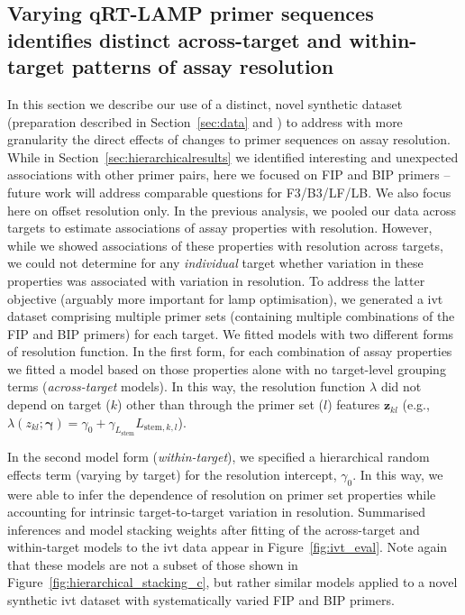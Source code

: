 \documentclass[../thesis.tex]{subfiles}
\begin{document}
\subsection{Varying qRT-LAMP primer sequences identifies distinct across-target and within-target patterns of assay resolution \label{sec:ivt_results}}
In this section we describe our use of a distinct, novel synthetic dataset (preparation described in Section~\ref{sec:data} and \citealp{remmel_diagnostic_2022}) to address with more granularity the direct effects of changes to primer sequences on assay resolution. While in Section~\ref{sec:hierarchicalresults} we identified interesting and unexpected associations with other primer pairs, here we focused on FIP and BIP primers -- future work will address comparable questions for F3/B3/LF/LB. We also focus here on offset resolution only. In the previous analysis, we pooled our data across targets to estimate associations of assay properties with resolution. However, while we showed associations of these properties with resolution across targets, we could not determine for any \emph{individual} target whether variation in these properties was associated with variation in resolution. To address the latter objective (arguably more important for \gls{lamp} optimisation), we generated a \gls{ivt}  dataset comprising multiple primer sets (containing multiple combinations of the FIP and BIP primers) for each target. We fitted models with two different forms of resolution function. In the first form, for each combination of assay properties we fitted a model based on those properties alone with no target-level grouping terms (\emph{across-target} models). In this way, the resolution function $\lambda$ did not depend on target ($k$) other than through the primer set ($l$) features $\bm{z}_{kl}$ (e.g., $\lambda(z_{kl}; \bm{\gamma}) = \gamma_0 + \gamma_{L_{\text{stem}}} L_{\text{stem},k,l}$).
 
In the second model form (\emph{within-target}), we specified a hierarchical random effects term (varying by target) for the resolution intercept, $\gamma_0$. In this way, we were able to infer the dependence of resolution on primer set properties while accounting for intrinsic target-to-target variation in resolution. Summarised inferences and model stacking weights after fitting of the across-target and within-target models to the \gls{ivt}  data appear in Figure~\ref{fig:ivt_eval}. Note again that these models are not a subset of those shown in Figure~\ref{fig:hierarchical_stacking_c}, but rather similar models applied to a novel synthetic \gls{ivt} dataset with systematically varied FIP and BIP primers.
\end{document}
